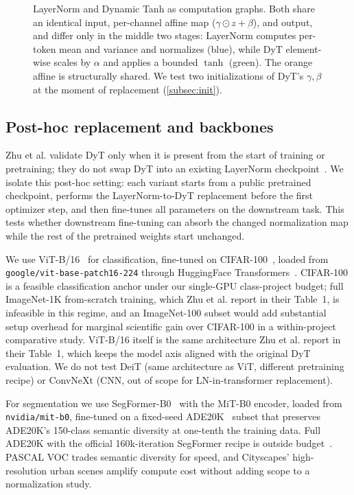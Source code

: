 \documentclass[10pt,twocolumn,letterpaper]{article}
\begin{document}
\begin{figure}[t]
\caption{LayerNorm and Dynamic Tanh as computation graphs. Both share an identical input, per-channel affine map ($\gamma \odot z + \beta$), and output, and differ only in the middle two stages: LayerNorm computes per-token mean and variance and normalizes (blue), while DyT element-wise scales by $\alpha$ and applies a bounded $\tanh$ (green). The orange affine is structurally shared. We test two initializations of DyT's $\gamma, \beta$ at the moment of replacement (\cref{subsec:init}).}
\label{fig:method}
\end{figure}

\subsection{Post-hoc replacement and backbones}
\label{subsec:posthoc}

Zhu et al. validate DyT only when it is present from the start of training or pretraining; they do not swap DyT into an existing LayerNorm checkpoint~\cite{zhu2025dyt}. We isolate this post-hoc setting: each variant starts from a public pretrained checkpoint, performs the LayerNorm-to-DyT replacement before the first optimizer step, and then fine-tunes all parameters on the downstream task. This tests whether downstream fine-tuning can absorb the changed normalization map while the rest of the pretrained weights start unchanged.

We use ViT-B/16~\cite{dosovitskiy2021vit} for classification, fine-tuned on CIFAR-100~\cite{krizhevsky2009cifar100}, loaded from \texttt{google/vit-base-patch16-224} through HuggingFace Transformers~\cite{wolf2020transformers}. CIFAR-100 is a feasible classification anchor under our single-GPU class-project budget; full ImageNet-1K from-scratch training, which Zhu et al. report in their Table~1, is infeasible in this regime, and an ImageNet-100 subset would add substantial setup overhead for marginal scientific gain over CIFAR-100 in a within-project comparative study. ViT-B/16 itself is the same architecture Zhu et al. report in their Table~1, which keeps the model axis aligned with the original DyT evaluation. We do not test DeiT (same architecture as ViT, different pretraining recipe) or ConvNeXt (CNN, out of scope for LN-in-transformer replacement).

For segmentation we use SegFormer-B0~\cite{xie2021segformer} with the MiT-B0 encoder, loaded from \texttt{nvidia/mit-b0}, fine-tuned on a fixed-seed ADE20K~\cite{zhou2017ade20k} subset that preserves ADE20K's 150-class semantic diversity at one-tenth the training data. Full ADE20K with the official 160k-iteration SegFormer recipe is outside budget~\cite{xie2021segformer,mmseg2020}. PASCAL VOC trades semantic diversity for speed, and Cityscapes' high-resolution urban scenes amplify compute cost without adding scope to a normalization study.
\end{document}
